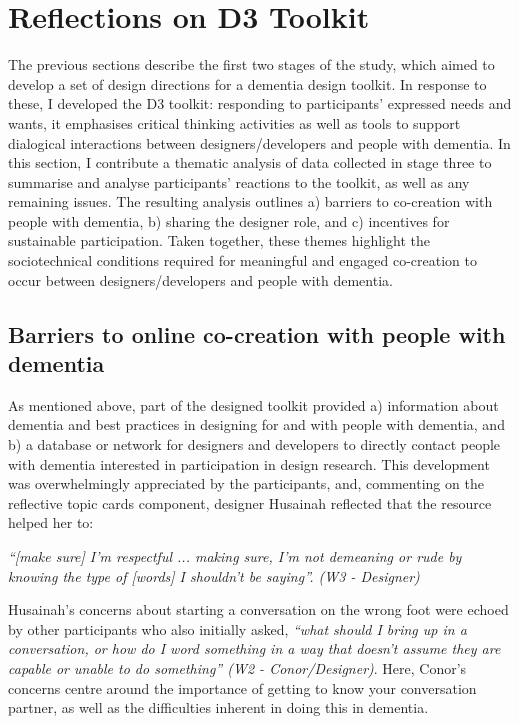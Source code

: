 \section{Reflections on D3 Toolkit}
\label{D3:Reflections}
The previous sections describe the first two stages of the study, which aimed to develop a set of design directions for a dementia design toolkit. In response to these, I developed the D3 toolkit: responding to participants’ expressed needs and wants, it emphasises critical thinking activities as well as tools to support dialogical interactions between designers/developers and people with dementia. In this section, I contribute a thematic analysis of data collected in stage three to summarise and analyse participants’ reactions to the toolkit, as well as any remaining issues. The resulting analysis outlines a) barriers to co-creation with people with dementia, b) sharing the designer role, and c) incentives for sustainable participation. Taken together, these themes highlight the sociotechnical conditions required for meaningful and engaged co-creation to occur between designers/developers and people with dementia. 

\subsection{Barriers to online co-creation with people with dementia}
As mentioned above, part of the designed toolkit provided a) information about dementia and best practices in designing for and with people with dementia, and b) a database or network for designers and developers to directly contact people with dementia interested in participation in design research. This development was overwhelmingly appreciated by the participants, and, commenting on the reflective topic cards component, designer Husainah reflected that the resource helped her to:

\textit{
 ``[make sure] I'm respectful ... making sure, I'm not demeaning or rude by knowing the type of [words] I shouldn't be saying''. (W3 - Designer)}
 
Husainah’s concerns about starting a conversation on the wrong foot were echoed by other participants who also initially asked, \textit{``what should I bring up in a conversation, or how do I word something in a way that doesn't assume they are capable or unable to do something'' (W2 - Conor/Designer)}. Here, Conor’s concerns centre around the importance of getting to know your conversation partner, as well as the difficulties inherent in doing this in dementia. 

